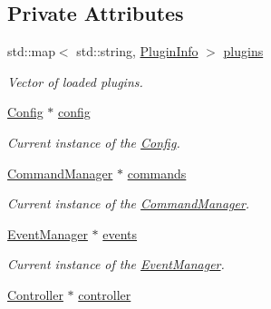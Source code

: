 \subsection*{Private Attributes}
\begin{DoxyCompactItemize}
\item 
\hypertarget{classPluginManager_a4a7dea3948d652d9a4428a237d5af805}{std\-::map$<$ std\-::string, \hyperlink{structPluginInfo}{Plugin\-Info} $>$ \hyperlink{classPluginManager_a4a7dea3948d652d9a4428a237d5af805}{plugins}}\label{classPluginManager_a4a7dea3948d652d9a4428a237d5af805}

\begin{DoxyCompactList}\small\item\em Vector of loaded plugins. \end{DoxyCompactList}\item 
\hypertarget{classPluginManager_a185603a6a022cef13ca60454c80ae4c4}{\hyperlink{classConfig}{Config} $\ast$ \hyperlink{classPluginManager_a185603a6a022cef13ca60454c80ae4c4}{config}}\label{classPluginManager_a185603a6a022cef13ca60454c80ae4c4}

\begin{DoxyCompactList}\small\item\em Current instance of the \hyperlink{classConfig}{Config}. \end{DoxyCompactList}\item 
\hypertarget{classPluginManager_a2759d12d4da860a2c5a1dbb7f76a035a}{\hyperlink{classCommandManager}{Command\-Manager} $\ast$ \hyperlink{classPluginManager_a2759d12d4da860a2c5a1dbb7f76a035a}{commands}}\label{classPluginManager_a2759d12d4da860a2c5a1dbb7f76a035a}

\begin{DoxyCompactList}\small\item\em Current instance of the \hyperlink{classCommandManager}{Command\-Manager}. \end{DoxyCompactList}\item 
\hypertarget{classPluginManager_a7966d86165aaa504ae4dd12f084d4cfa}{\hyperlink{classEventManager}{Event\-Manager} $\ast$ \hyperlink{classPluginManager_a7966d86165aaa504ae4dd12f084d4cfa}{events}}\label{classPluginManager_a7966d86165aaa504ae4dd12f084d4cfa}

\begin{DoxyCompactList}\small\item\em Current instance of the \hyperlink{classEventManager}{Event\-Manager}. \end{DoxyCompactList}\item 
\hypertarget{classPluginManager_a3b08105f2c52f52d21d293fe0045ae1f}{\hyperlink{structController}{Controller} $\ast$ \hyperlink{classPluginManager_a3b08105f2c52f52d21d293fe0045ae1f}{controller}}\label{classPluginManager_a3b08105f2c52f52d21d293fe0045ae1f}


\end{DoxyCompactItemize}
